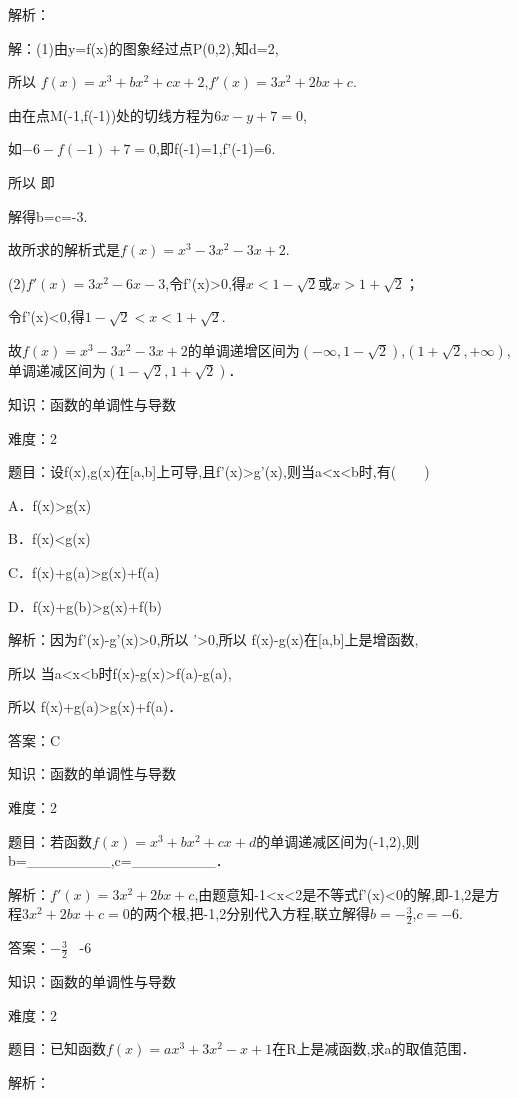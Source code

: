 \documentclass{article} %
\begin{document}
解析：

解：(1)由y=f(x)的图象经过点P(0,2),知d=2,

所以 $f(x)=x^{3}+bx^{2}+cx+2$,$f'(x)=3x^{2}+2bx+c$.

由在点M(-1,f(-1))处的切线方程为$6x-y+7=0$,

如$-6-f(-1)+7=0$,即f(-1)=1,f'(-1)=6.

所以 即

解得b=c=-3.

故所求的解析式是$f(x)=x^{3}-3x^{2}-3x+2$.

(2)$f'(x)=3x^{2}-6x-3$,令f'(x)>0,得$x<1-\sqrt{2}$或$x>1+\sqrt{2}$；

令f'(x)<0,得$1-\sqrt{2}<x<1+\sqrt{2}$.

故$f(x)=x^{3}-3x^{2}-3x+2$的单调递增区间为$(-\infty,1-\sqrt{2})$,$(1+\sqrt{2},+\infty)$,单调递减区间为$(1-\sqrt{2},1+\sqrt{2})$．



知识：函数的单调性与导数

难度：2

题目：设f(x),g(x)在[a,b]上可导,且f'(x)>g'(x),则当a<x<b时,有(　　)

A．f(x)>g(x)

B．f(x)<g(x)

C．f(x)+g(a)>g(x)+f(a)

D．f(x)+g(b)>g(x)+f(b)

解析：因为f'(x)-g'(x)>0,所以 '>0,所以 f(x)-g(x)在[a,b]上是增函数,

所以 当a<x<b时f(x)-g(x)>f(a)-g(a),

所以 f(x)+g(a)>g(x)+f(a)．

答案：C



知识：函数的单调性与导数

难度：2

题目：若函数$f(x)=x^{3}+bx^{2}+cx+d$的单调递减区间为(-1,2),则b=\_\_\_\_\_\_\_\_,c=\_\_\_\_\_\_\_\_．

解析：$f'(x)=3x^{2}+2bx+c$,由题意知-1<x<2是不等式f'(x)<0的解,即-1,2是方程$3x^{2}+2bx+c=0$的两个根,把-1,2分别代入方程,联立解得$b=-\frac{3}{2}$,$c=-6$.

答案：$-\frac{3}{2}$ \ -6



知识：函数的单调性与导数

难度：2

题目：已知函数$f(x)=ax^{3}+3x^{2}-x+1$在R上是减函数,求a的取值范围．

解析：
\end{document}
